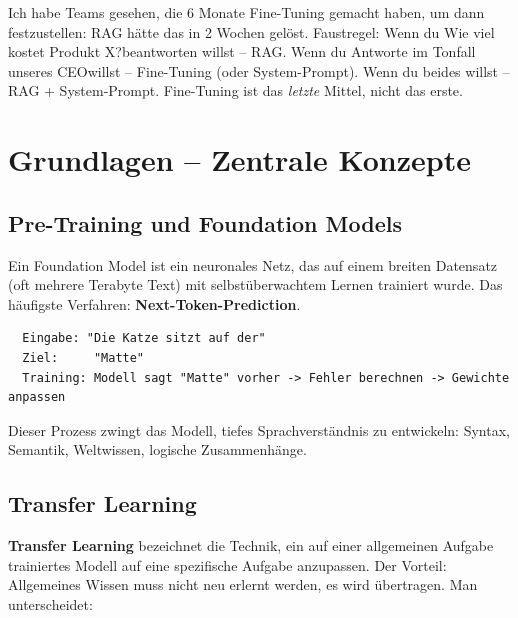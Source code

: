 \par



\par\mbox{}\par
\begin{realitycheckEnv}
Ich habe Teams gesehen, die 6 Monate Fine-Tuning gemacht haben, um dann festzustellen: RAG hätte das in 2 Wochen gelöst.
Faustregel: Wenn du \glqq Wie viel kostet Produkt X?\grqq beantworten willst -- RAG.
Wenn du \glqq Antworte im Tonfall unseres CEO\grqq willst -- Fine-Tuning (oder System-Prompt).
Wenn du beides willst -- RAG + System-Prompt. Fine-Tuning ist das \textit{letzte} Mittel, nicht das erste.
\end{realitycheckEnv}

\section{Grundlagen -- Zentrale Konzepte}

\subsection{Pre-Training und Foundation Models}

Ein Foundation Model ist ein neuronales Netz, das auf einem breiten Datensatz (oft mehrere Terabyte Text) mit selbstüberwachtem Lernen trainiert wurde. Das häufigste Verfahren: \textbf{Next-Token-Prediction}.

\begin{verbatim}
  Eingabe: "Die Katze sitzt auf der"
  Ziel:     "Matte"
  Training: Modell sagt "Matte" vorher -> Fehler berechnen -> Gewichte anpassen
\end{verbatim}

Dieser Prozess zwingt das Modell, tiefes Sprachverständnis zu entwickeln: Syntax, Semantik, Weltwissen, logische Zusammenhänge.

\subsection{Transfer Learning}

\textbf{Transfer Learning} bezeichnet die Technik, ein auf einer allgemeinen Aufgabe trainiertes Modell auf eine spezifische Aufgabe anzupassen. Der Vorteil: Allgemeines Wissen muss nicht neu erlernt werden, es wird übertragen. Man unterscheidet:

